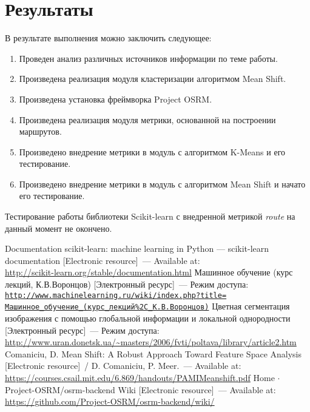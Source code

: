 \chapter{Результаты}
В результате выполнения можно заключить следующее:
\begin{enumerate}\itemsep-.5ex
    \item Проведен анализ различных источников информации по теме работы.
    \item Произведена реализация модуля кластеризации алгоритмом Mean Shift.
    \item Произведена установка фреймворка Project OSRM.
    \item Произведена реализация модуля метрики, основанной на построении маршрутов.
    \item Произведено внедрение метрики в модуль с алгоритмом K-Means и его тестирование.
    \item Произведено внедрение метрики в модуль с алгоритмом Mean Shift и начато его тестирование.
\end{enumerate}

Тестирование работы библиотеки Scikit-learn с внедренной метрикой \emph{route} на данный момент
не окончено.

\newpage

\renewcommand{\bibname}{Список используемой литературы}
\begin{thebibliography}{10}
     Documentation scikit-learn: machine learning in Python — scikit-learn
        documentation [Electronic resource]~--- Available at:\\
        \url{http://scikit-learn.org/stable/documentation.html}
     Машинное обучение (курс лекций, К.В.Воронцов) [Электронный ресурс]~---
        Режим доступа:\\
        \href{http://www.machinelearning.ru/wiki/index.php?title=%
            Машинное\_обучение\_(курс\_лекций\%2C\_К.В.Воронцов)}
     Цветная сегментация изображения с помощью глобальной информации и локальной
        однородности [Электронный ресурс]~--- Режим доступа:\\
        \url{http://www.uran.donetsk.ua/~masters/2006/fvti/poltava/library/article2.htm}
     Comaniciu, D. Mean Shift: A Robust Approach Toward Feature Space Analysis
        [Electronic resource]~/ D. Comaniciu, P. Meer.~--- Available at:\\
        \url{https://courses.csail.mit.edu/6.869/handouts/PAMIMeanshift.pdf}
     Home \(\cdot\) Project-OSRM/osrm-backend Wiki [Electronic resource]~---
        Available at:\\
        \url{https://github.com/Project-OSRM/osrm-backend/wiki/}
\end{thebibliography}


